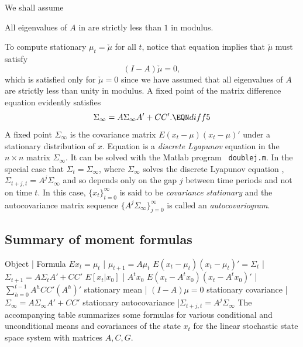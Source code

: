 \noindent We shall  assume


\medskip
{}  All  eigenvalues of $A$ in
 are strictly less than $1$ in modulus.

\medskip

\noindent To compute stationary $\mu_t = \check \mu$ for all $t$, notice that
equation  implies that $\check \mu$ must satisfy
$$ (I - A) \check \mu = 0 , $$
which is satisfied only for $\check \mu =0 $ since we have assumed that
all eigenvalues of $A$ are strictly less than unity in modulus.
A fixed point of the matrix difference equation  evidently  satisfies
$$ \Sigma_\infty = A \Sigma_\infty A' + C C' .  \EQN diff5 $$
A fixed point $ \Sigma_\infty  $
 is the covariance matrix $E (x_t -\mu) (x_t - \mu)'$ under  a stationary distribution of $x$.
%
Equation  is
a {\it discrete Lyapunov} equation in the $n \times n$ matrix
$\Sigma_\infty$.  It can be solved with the Matlab program {\tt
doublej.m}. %
%
In the special case that $\Sigma_t = \Sigma_\infty$, where $\Sigma_\infty$  solves the discrete Lyapunov equation
, $\Sigma_{t+j,t} = A^j \Sigma_\infty$ and so depends only on the gap $j$ between time
periods and not on time $t$. In this case, $\{x_t\}_{t=0}^\infty$ is said to be {\it covariance stationary\/} and the  autocovariance  matrix sequence $\{A^j \Sigma_\infty\}_{j=0}^\infty$ is  called an {\it
autocovariogram}.  %


\subsection{Summary of moment formulas}\label{sec:summarymoments}
\medskip



Object | Formula \cr
$E x_t = \mu_t$   |  $ \mu_{t+1} = A \mu_t$ \nr
$E (x_t - \mu_t)(x_t - \mu_t)' = \Sigma_t$ | $\Sigma_{t+1} = A \Sigma_{t} A' + C C' $ \cr
 $E [x_t\vert x_0] $ | $A^t x_0$ \nr
$E(x_t - A^t x_0)(x_t - A^t x_0)'$ | $\sum_{h=0}^{t-1} A^h C C' (A^h)'$ \cr
stationary mean | $(I - A)\mu =0$ \nr
stationary covariance | $\Sigma_\infty = A \Sigma_\infty A' + C C' $ \nr
stationary autocovariance |$ \Sigma_{t+j,t} = A^j \Sigma_\infty$
\endruledtable
\medskip
\noindent The accompanying table summarizes some formulas for various conditional and unconditional means  and covariances of
the state $x_t$  for the  linear stochastic state space system with matrices  $A, C, G$.


